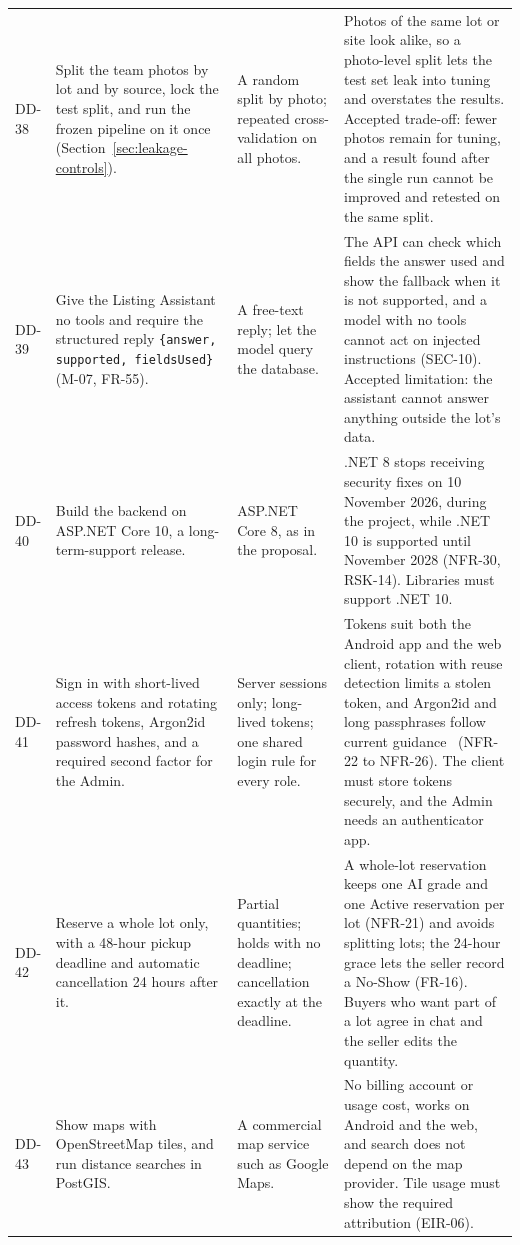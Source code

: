 {\begin{longtable}{@{}>{\raggedright\arraybackslash}p{}>{\raggedright\arraybackslash}p{}>{\raggedright\arraybackslash}p{}>{\raggedright\arraybackslash}p{}@{}}
DD-38 & Split the team photos by lot and by source, lock the test split, and run the frozen pipeline on it once (Section~\ref{sec:leakage-controls}). & A random split by photo; repeated cross-validation on all photos. & Photos of the same lot or site look alike, so a photo-level split lets the test set leak into tuning and overstates the results. Accepted trade-off: fewer photos remain for tuning, and a result found after the single run cannot be improved and retested on the same split. \\
DD-39 & Give the Listing Assistant no tools and require the structured reply \texttt{\{answer, supported, fieldsUsed\}} (M-07, FR-55). & A free-text reply; let the model query the database. & The API can check which fields the answer used and show the fallback when it is not supported, and a model with no tools cannot act on injected instructions (SEC-10). Accepted limitation: the assistant cannot answer anything outside the lot's data. \\
DD-40 & Build the backend on ASP.NET Core 10, a long-term-support release. & ASP.NET Core 8, as in the proposal. & .NET 8 stops receiving security fixes on 10 November 2026, during the project, while .NET 10 is supported until November 2028 (NFR-30, RSK-14). Libraries must support .NET 10. \\
DD-41 & Sign in with short-lived access tokens and rotating refresh tokens, Argon2id password hashes, and a required second factor for the Admin. & Server sessions only; long-lived tokens; one shared login rule for every role. & Tokens suit both the Android app and the web client, rotation with reuse detection limits a stolen token, and Argon2id and long passphrases follow current guidance~\citep{owasppasswordstorage,nist80063b4} (NFR-22 to NFR-26). The client must store tokens securely, and the Admin needs an authenticator app. \\
DD-42 & Reserve a whole lot only, with a 48-hour pickup deadline and automatic cancellation 24 hours after it. & Partial quantities; holds with no deadline; cancellation exactly at the deadline. & A whole-lot reservation keeps one AI grade and one Active reservation per lot (NFR-21) and avoids splitting lots; the 24-hour grace lets the seller record a No-Show (FR-16). Buyers who want part of a lot agree in chat and the seller edits the quantity. \\
DD-43 & Show maps with OpenStreetMap tiles, and run distance searches in PostGIS. & A commercial map service such as Google Maps. & No billing account or usage cost, works on Android and the web, and search does not depend on the map provider. Tile usage must show the required attribution (EIR-06). \\

\end{longtable}}
